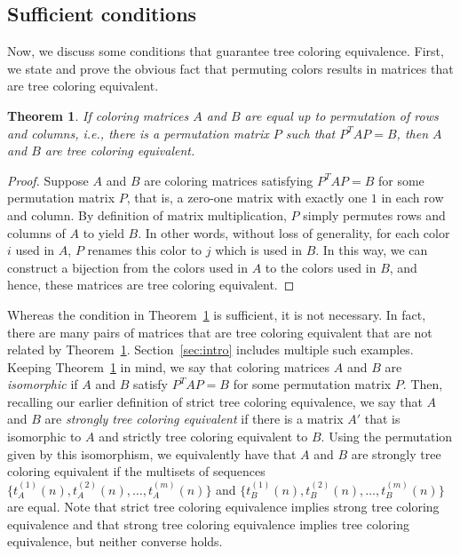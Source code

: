 \documentclass[12pt]{amsart}
\newtheorem{theorem}{Theorem}
\begin{document}
\subsection{Sufficient conditions}\label{sec:constructions}

Now, we discuss some conditions that guarantee tree coloring equivalence. 
First, we state and prove the obvious fact that permuting colors results in matrices that are tree coloring equivalent.

\begin{theorem}\label{prop:permmat}
If coloring matrices $A$ and $B$ are equal up to permutation of rows and columns, i.e., there is a permutation matrix $P$ such that $P^TAP = B$, then $A$ and $B$ are tree coloring equivalent.
\end{theorem}

\begin{proof}
    Suppose $A$ and $B$ are coloring matrices satisfying $P^TAP = B$ for some permutation matrix $P$, that is, a zero-one matrix with exactly one $1$ in each row and column. 
    By definition of matrix multiplication, $P$ simply permutes rows and columns of $A$ to yield $B$.
    In other words, without loss of generality, for each color $i$ used in $A$, $P$ renames this color to $j$ which is used in $B$.
    In this way, we can construct a bijection from the colors used in $A$ to the colors used in $B$, and hence, these matrices are tree coloring equivalent.
\end{proof}

Whereas the condition in Theorem~\ref{prop:permmat} is sufficient, it is not necessary. In fact, there are many pairs of matrices that are tree coloring equivalent that are not related by Theorem~\ref{prop:permmat}. Section~\ref{sec:intro} includes multiple such examples. 
Keeping Theorem~\ref{prop:permmat} in mind, we say that coloring matrices $A$ and $B$ are \emph{isomorphic} if $A$ and $B$ satisfy $P^TAP = B$ for some permutation matrix $P$. 
Then, recalling our earlier definition of strict tree coloring equivalence, we say that $A$ and $B$ are \emph{strongly tree coloring equivalent} if there is a matrix $A'$ that is isomorphic to $A$ and strictly tree coloring equivalent to $B$. 
Using the permutation given by this isomorphism, we equivalently have that 
$A$ and $B$ are strongly tree coloring equivalent if the multisets 
of sequences $\{t_A^{(1)}(n),t_A^{(2)}(n),\ldots,t_A^{(m)}(n)\}$ and $\{t_B^{(1)}(n),t_B^{(2)}(n),\ldots,t_B^{(m)}(n)\}$ are equal. 
Note that strict tree coloring equivalence implies strong tree coloring equivalence and that strong tree coloring equivalence implies tree coloring equivalence, but neither converse holds.
\end{document}
